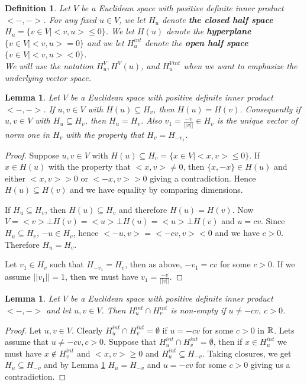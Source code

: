 \documentclass[psamsfonts]{amsart}
\numberwithin{equation}{subsection}
\theoremstyle{plain}
\newtheorem{lemma}[theorem]{Lemma}
\newtheorem{definition}[theorem]{Definition}
\theoremstyle{definition}
\theoremstyle{remark}
\begin{document}
\begin{definition} Let $V$ be a Euclidean space with positive definite inner product $<- , ->$. For any fixed $u  \in V$, we let $H_u$ denote {\bf the closed half space}   $H_u = \{v \in V | <v, u>  \leq 0 \}$. 
We let $H(u)$ denote the {\bf hyperplane} $\{ v \in V | 
<v, u> = 0 \}$ and we let $H_u^{int}$ denote the {\bf open half space }
$\{ v \in V | 
<v, u> < 0 \}$. \\
We will use the notation $H^V_u, H^V(u)$, and $H^{Vint}_u$ when we want to emphasize  the 
underlying vector space.\\
\end{definition}

 \begin{lemma} \label{hyper}Let $V$ be a Euclidean space with positive definite inner product \\$<- , ->$. If 
 $u, v \in V$ with $H(u) \subseteq H_v$,
  then   $H(u) = H(v)$. Consequently if  $u, v \in V$ with
  $H_u \subseteq H_v$, then $H_u = H_v$.
  Also  $v_1 = \frac{-v}{||v||}  \in H_v$ is the unique vector of norm one in $H_v$ with the property that $H_{v} = H_{-v_1}$. 
\end{lemma}
\begin{proof} Suppose $u, v \in V$ with  $H(u) \subseteq H_v = \{x \in V | <x, v> \leq 0 \}$. If $x \in H(u)$ with the property that 
$<x, v> \not= 0$, then $\{x,-x\} \in H(u)$ and either  $<x, v>  > 0$ or $<-x, v> > 0$ giving a contradiction. Hence  $H(u) \subseteq
H(v)$ and we have equality by comparing dimensions. 

If $H_u \subseteq H_v$, then $H(u) \subseteq H_v$ and therefore $H(u) = H(v)$. Now  $V  = <v> \bot H(v) = <u> \bot H(u) = <u> \bot H(v)$ and $u = cv$. Since 
$H_u \subseteq H_v$,  $-u \in H_v$, hence
$<-u, v> = <-cv, v> < 0$ and we have $c > 0$. Therefore $H_u = H_v$. 

Let $v_1 \in H_v$ such that $H_{-v_1}  = H_{v}$, then as above, 
   $-v_1 = cv$ for some $c > 0$. If we assume $||v_1|| = 1$, then we must have $v_1 = \frac{-v}{||v||} $. 
\end{proof}


\begin{lemma} \label{halfspaceintersect}
Let $V$ be a Euclidean space with positive definite inner product \\$<- , ->$ and let $u, v \in V$. Then 
$H_u^{int} \cap H_v^{int}$ is non-empty if $ u \not= -cv, \ c > 0$. 
\end{lemma}

\begin{proof} Let $u, v \in V$. Clearly $H_u^{int} \cap H_v^{int} = \emptyset$ if $u = -cv$ for some $c > 0$ in $\Bbb{R}$. Lets assume that  $u \not= -cv, c > 0$.  Suppose  that $H_u^{int} \cap H_v^{int} = \emptyset$, then if $x \in H_u^{int}$ we must have $x \not\in H_v^{int}$
and $<x, v> \geq 0$ and $H_u^{int}  \subseteq H_{-v}$. Taking closures, we get $H_u \subseteq H_{-v}$ and by Lemma  \ref{hyper} $H_u = H_{-v}$ and $u = -cv$ for some $c > 0$ giving us a contradiction. 
\end{proof}
\end{document}

